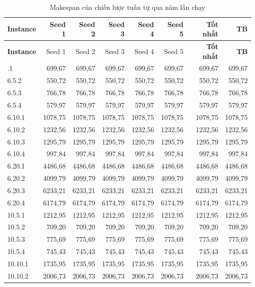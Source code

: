 \documentclass[../DoAn.tex]{subfiles}
\begin{document}
\begin{small}
\begin{longtable}{l|rrrrr|rr}
\caption{Makespan của chiến lược tuần tự qua năm lần chạy}\label{tab:appA_seq}\\
\toprule
\textbf{Instance} & Seed 1 & Seed 2 & Seed 3 & Seed 4 & Seed 5 & \textbf{Tốt nhất} & \textbf{TB} \\
\midrule
\endfirsthead
\toprule
\textbf{Instance} & Seed 1 & Seed 2 & Seed 3 & Seed 4 & Seed 5 & \textbf{Tốt nhất} & \textbf{TB} \\
\midrule
\endhead
\bottomrule
\endfoot
6.5.1 & 699,67 & 699,67 & 699,67 & 699,67 & 699,67 & 699,67 & 699,67 \\
6.5.2 & 550,72 & 550,72 & 550,72 & 550,72 & 550,72 & 550,72 & 550,72 \\
6.5.3 & 766,78 & 766,78 & 766,78 & 766,78 & 766,78 & 766,78 & 766,78 \\
6.5.4 & 579,97 & 579,97 & 579,97 & 579,97 & 579,97 & 579,97 & 579,97 \\
6.10.1 & 1078,75 & 1078,75 & 1078,75 & 1078,75 & 1078,75 & 1078,75 & 1078,75 \\
6.10.2 & 1232,56 & 1232,56 & 1232,56 & 1232,56 & 1232,56 & 1232,56 & 1232,56 \\
6.10.3 & 1295,79 & 1295,79 & 1295,79 & 1295,79 & 1295,79 & 1295,79 & 1295,79 \\
6.10.4 & 997,84 & 997,84 & 997,84 & 997,84 & 997,84 & 997,84 & 997,84 \\
6.20.1 & 4486,68 & 4486,68 & 4486,68 & 4486,68 & 4486,68 & 4486,68 & 4486,68 \\
6.20.2 & 4099,79 & 4099,79 & 4099,79 & 4099,79 & 4099,79 & 4099,79 & 4099,79 \\
6.20.3 & 6233,21 & 6233,21 & 6233,21 & 6233,21 & 6233,21 & 6233,21 & 6233,21 \\
6.20.4 & 6174,79 & 6174,79 & 6174,79 & 6174,79 & 6174,79 & 6174,79 & 6174,79 \\
10.5.1 & 1212,95 & 1212,95 & 1212,95 & 1212,95 & 1212,95 & 1212,95 & 1212,95 \\
10.5.2 & 709,20 & 709,20 & 709,20 & 709,20 & 709,20 & 709,20 & 709,20 \\
10.5.3 & 775,69 & 775,69 & 775,69 & 775,69 & 775,69 & 775,69 & 775,69 \\
10.5.4 & 745,43 & 745,43 & 745,43 & 745,43 & 745,43 & 745,43 & 745,43 \\
10.10.1 & 1735,95 & 1735,95 & 1735,95 & 1735,95 & 1735,95 & 1735,95 & 1735,95 \\
10.10.2 & 2006,73 & 2006,73 & 2006,73 & 2006,73 & 2006,73 & 2006,73 & 2006,73 \\

\end{longtable}
\end{small}
\end{document}

